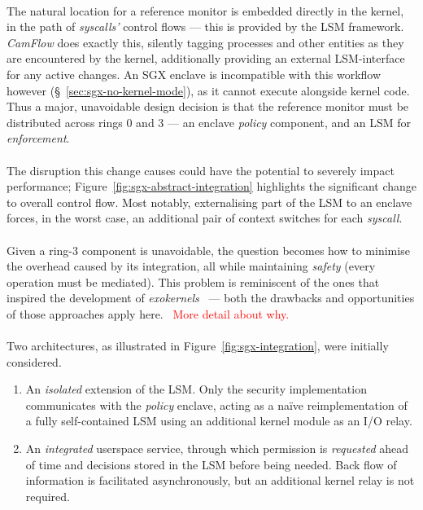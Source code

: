 \paragraph{} The natural location for a reference monitor is embedded directly in the kernel, in the path of \textit{syscalls'} control flows --- this is provided by the LSM framework. \textit{CamFlow} does exactly this, silently tagging processes and other entities as they are encountered by the kernel, additionally providing an external LSM-interface for any active changes. An SGX enclave is incompatible with this workflow however (§~\ref{sec:sgx-no-kernel-mode}), as it cannot execute alongside kernel code. Thus a major, unavoidable design decision is that the reference monitor must be distributed across rings 0 and 3 --- an enclave \textit{policy} component, and an LSM for \textit{enforcement}.

\paragraph{} The disruption this change causes could have the potential to severely impact performance; Figure~\ref{fig:sgx-abstract-integration} highlights the significant change to overall control flow. Most notably, externalising part of the LSM to an enclave forces, in the worst case, an additional pair of context switches for each \textit{syscall}.

\paragraph{} Given a ring-3 component is unavoidable, the question becomes how to minimise the overhead caused by its integration, all while maintaining \textit{safety} (every operation must be mediated). This problem is reminiscent of the ones that inspired the development of \textit{exokernels}~\cite{10.1145/224056.224076} --- both the drawbacks and opportunities of those approaches apply here.~\cite{10.1145/269005.266644} \textcolor{red}{More detail about why.}

\paragraph{} Two architectures, as illustrated in Figure~\ref{fig:sgx-integration}, were initially considered. 

\begin{enumerate}
    \item An \textit{isolated} extension of the LSM. Only the security implementation communicates with the \textit{policy} enclave, acting as a na\"{i}ve reimplementation of a fully self-contained LSM using an additional kernel module as an I/O relay.
    \item An \textit{integrated} userspace service, through which permission is \textit{requested} ahead of time and decisions stored in the LSM before being needed. Back flow of information is facilitated asynchronously, but an additional kernel relay is not required.
\end{enumerate}



